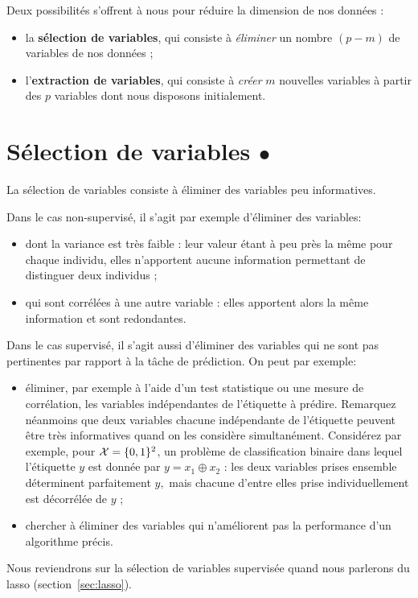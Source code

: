 Deux possibilités s'offrent à nous pour réduire la dimension de nos données :
\begin{itemize}
\item la \textbf{sélection de variables}, qui consiste à \textit{éliminer} un nombre
  $(p-m)$ de variables de nos données ;
\item l'\textbf{extraction de variables}, qui consiste à {\it créer} $m$
  nouvelles variables à partir des $p$ variables dont nous disposons
  initialement.
\end{itemize}



\section{Sélection de variables $\bullet$} 

La sélection de variables consiste à éliminer des variables peu informatives.

Dans le cas non-supervisé, il s'agit par exemple d'éliminer des variables:
\begin{itemize}
\item dont la variance est très faible : leur valeur étant à peu près la même
  pour chaque individu, elles n'apportent aucune information permettant de
  distinguer deux individus ;
\item qui sont corrélées à une autre variable : elles apportent alors la même
  information et sont redondantes.
\end{itemize}

Dans le cas supervisé, il s'agit aussi d'éliminer des variables qui ne sont pas
pertinentes par rapport à la tâche de prédiction. On peut par exemple:
\begin{itemize}
\item éliminer, par exemple à l'aide d'un test statistique ou une mesure de corrélation,
  les variables indépendantes de l'étiquette à prédire. Remarquez néanmoins que
  deux variables chacune indépendante de l'étiquette peuvent être très
  informatives quand on les considère simultanément. Considérez par exemple,
  pour $\mathcal{X} = \lbrace 0, 1 \rbrace^2$, un problème de classification binaire dans lequel
  l'étiquette $y$ est donnée par $y = x_1 \oplus x_2$ : les deux variables
  prises ensemble déterminent parfaitement $y,$ mais chacune d'entre elles
  prise individuellement est décorrélée de $y$ ;
\item chercher à éliminer des variables qui n'améliorent pas la performance
  d'un algorithme précis.
\end{itemize}
Nous reviendrons sur la
sélection de variables supervisée quand nous parlerons du lasso
(section~\ref{sec:lasso}).


